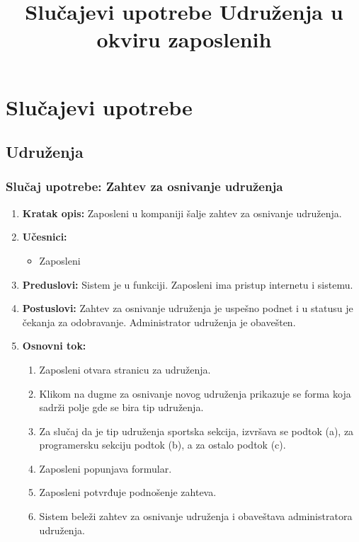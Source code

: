 \documentclass[a4paper]{article}
\title{Slučajevi upotrebe Udruženja u okviru zaposlenih}
\begin{document}
\maketitle

\section{Slučajevi upotrebe}

\subsection{Udruženja}
\subsubsection{Slučaj upotrebe: Zahtev za osnivanje udruženja}
\begin{enumerate}
    \item \textbf{Kratak opis:} Zaposleni u kompaniji šalje zahtev za osnivanje udruženja.
    \item \textbf{Učesnici:}
        \begin{itemize}
            \item Zaposleni
        \end{itemize}
    \item \textbf{Preduslovi:} Sistem je u funkciji. Zaposleni ima pristup internetu i sistemu.
    \item \textbf{Postuslovi:} Zahtev za osnivanje udruženja je uspešno podnet i u statusu je čekanja za odobravanje. Administrator udruženja je obavešten.
    \item \textbf{Osnovni tok:}
        \begin{enumerate}
            \item Zaposleni otvara stranicu za udruženja.
            \item Klikom na dugme za osnivanje novog udruženja prikazuje se forma koja sadrži polje gde se bira tip udruženja.
            \item Za slučaj da je tip udruženja sportska sekcija, izvršava se podtok (a), za programersku sekciju podtok (b), a za ostalo podtok (c).
            \item Zaposleni popunjava formular.
            \item Zaposleni potvrđuje podnošenje zahteva.
            \item Sistem beleži zahtev za osnivanje udruženja i obaveštava administratora udruženja.
        \end{enumerate}

\end{enumerate}
\end{document}
